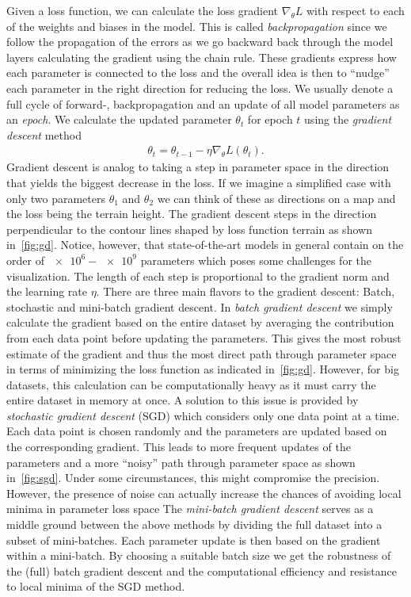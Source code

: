 Given a loss function, we can calculate the loss gradient $\nabla_\theta L$ with respect to each of the weights and biases in the model. This is called \textit{backpropagation} since we follow the propagation of the errors as we go backward back through the model layers calculating the gradient using the chain rule. These gradients express how each parameter is connected to the loss and the overall idea is then to ``nudge'' each parameter in the right direction for reducing the loss. We usually denote a full cycle of forward-, backpropagation and an update of all model parameters as an \textit{epoch}. We calculate the updated parameter $\theta_t$ for epoch $t$ using the \textit{gradient descent} method
\begin{align*}
  \theta_{t} = \theta_{t-1} - \eta \nabla_\theta L(\theta_t).
\end{align*}
Gradient descent is analog to taking a step in parameter space in the direction
that yields the biggest decrease in the loss. If we imagine a simplified case
with only two parameters $\theta_1$ and $\theta_2$ we can think of these as directions on a map and the loss being the terrain height. The gradient descent steps in the direction perpendicular to the contour lines shaped by loss function terrain as shown in~\cref{fig:gd}. Notice, however, that state-of-the-art models in general contain on the order of $\num{e6}-\num{e9}$ parameters \cite{thompson2022computational} which poses some challenges for the visualization.  The length of each step is proportional to the gradient norm and the learning rate $\eta$. There are three main flavors to the gradient descent: Batch,
stochastic and mini-batch gradient descent. In \textit{batch gradient descent} we simply
calculate the gradient based on the entire dataset by averaging the contribution
from each data point before updating the parameters. This gives the most robust estimate of the gradient and thus the most direct path through parameter space in terms of minimizing the loss function as
indicated in~\cref{fig:gd}. However, for big datasets, this calculation can be
computationally heavy as it must carry the entire dataset in memory at once. A
solution to this issue is provided by \textit{stochastic gradient descent}
(\acrshort{SGD}) which considers only one data point at a time. Each data point is chosen randomly and the parameters are updated based on the corresponding gradient. This leads to more frequent updates of the parameters and a more ``noisy'' path through parameter space as shown in~\cref{fig:sgd}.  Under some circumstances, this might compromise the precision. However, the presence of noise can actually increase the chances of avoiding local minima in parameter loss space The \textit{mini-batch gradient descent} serves as a middle ground between the above methods by dividing the full dataset into a subset of mini-batches. Each parameter update is then based on the gradient within a mini-batch. By choosing a suitable batch size we get the robustness of the (full) batch gradient descent and the computational efficiency and resistance to local minima of the \acrshort{SGD} method. 


